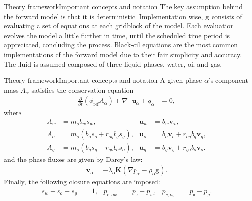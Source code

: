 \begin{frame}{Theory framework}{Important concepts and notation}
    The key assumption behind the forward model is that it is deterministic. 
    Implementation wise, $\mathbf{g}$ consists of evaluating a set of equations 
    at each gridblock of the model.
    \vfill
    Each evaluation evolves the model a little further in time, 
    until the scheduled time period is appreciated, concluding the process.
    \vfill
    Black-oil equations are the most common implementations of the forward model
    \cite{Rasmussen:2021} due to their fair simplicity and accuracy.
    The fluid is assumed composed of three liquid phases, water, oil and gas.
    \vfill
\end{frame}

\begin{frame}{Theory framework}{Important concepts and notation}
    A given phase $\alpha$'s component mass $A_\alpha$ satisfies the conservation equation
    \begin{align}
        \frac{\partial}{\partial t} \left(\phi_{\text{ref}} A_\alpha \right)
        + \nabla \cdot \mathbf{u}_\alpha + q_\alpha & = 0,
    \label{eq:materialbalance-cont}
    \end{align}
    where 
    \begin{subequations}
        \label{eq:acc}
        \begin{align}
            A_w &= m_{\phi} b_{w} s_{w},                      & \mathbf{u}_w &= b_{w} \mathbf{v}_{w}, \\
            A_o &= m_{\phi} (b_{o} s_{o} + r_{og}b_{g}s_{g}), & \mathbf{u}_o &= b_{o} \mathbf{v}_{o} +
            r_{og}b_{g}\mathbf{v}_{g}, \\
            A_g &= m_{\phi} (b_{g} s_{g} + r_{go}b_{o}s_{o}), & \mathbf{u}_g &= b_{g} \mathbf{v}_{g} +
            r_{go}b_{o}\mathbf{v}_{o}.
        \end{align}
    \end{subequations}
    and the phase fluxes are given by Darcy's law:
    \begin{align}
        \mathbf{v}_\alpha = -\lambda_\alpha \mathbf{K} (\nabla p_\alpha - \rho_\alpha \mathbf{g}).
        \label{eq:Darcy-mph}
    \end{align}
    Finally, the following closure equations are imposed:
    \begin{align}
        s_w + s_o + s_g &= 1,
        &p_{c,ow} &= p_{o} - p_{w},
        &p_{c,og} &= p_{o} - p_{g}. \label{eq:capillary}
    \end{align} 
\end{frame}

